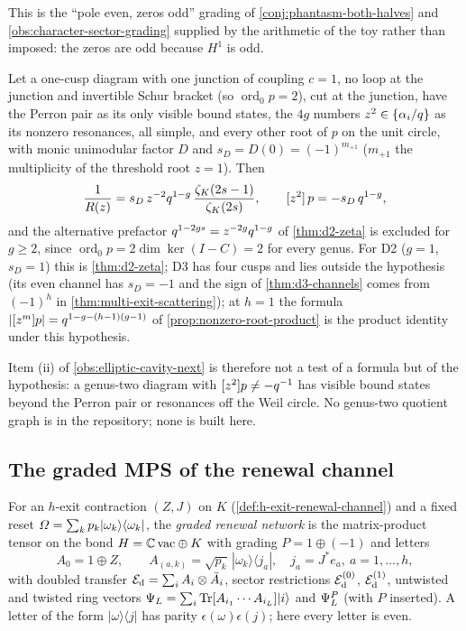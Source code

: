 This is the ``pole even, zeros odd'' grading of \cref{conj:phantasm-both-halves} and \cref{obs:character-sector-grading}
supplied by the arithmetic of the toy rather than imposed: the zeros are odd because $H^1$ is odd.

\begin{proposition}
\label{prop:genus-prefactor-forced}
Let a one-cusp diagram with one junction of coupling $c = 1$, no loop at the junction and invertible Schur
bracket (so $\operatorname{ord}_0p = 2$), cut at the junction, have the Perron pair as its only visible bound states,
the $4g$ numbers $z^2\in\{\alpha_{i}/q\}$ as its nonzero resonances, all simple, and every other root of $p$ on the
unit circle, with monic unimodular factor $D$ and $s_D = D(0) = (-1)^{m_{+1}}$
($m_{+1}$ the multiplicity of the threshold root $z = 1$). Then
\[
\frac1{R(z)} = s_D\,z^{-2}q^{1-g}\,\frac{\zeta_K(2s-1)}{\zeta_K(2s)},\qquad [z^2]\,p = -s_D\,q^{1-g},
\]
and the alternative prefactor $q^{1-2gs} = z^{-2g}q^{1-g}$ of \cref{thm:d2-zeta} is excluded for $g\ge2$, since
$\operatorname{ord}_0p = 2\dim\ker(I-C) = 2$ for every genus. For D2 ($g = 1$, $s_D = 1$) this is
\cref{thm:d2-zeta}; D3 has four cusps and lies outside the hypothesis (its even channel has $s_D = -1$ and the sign
of \cref{thm:d3-channels} comes from $(-1)^h$ in \cref{thm:multi-exit-scattering}); at $h = 1$ the formula $|[z^m]p| = q^{1-g-(h-1)(g-1)}$ of
\cref{prop:nonzero-root-product} is the product identity under this hypothesis.
\end{proposition}

Item (ii) of \cref{obs:elliptic-cavity-next} is therefore not a test of a formula but of the hypothesis: a
genus-two diagram with $[z^2]p\ne-q^{-1}$ has visible bound states beyond the Perron pair or resonances off
the Weil circle. No genus-two quotient graph is in the repository; none is built here.

\subsection{The graded MPS of the renewal channel}

\begin{definition}
\label{def:graded-renewal-network}
For an $h$-exit contraction $(Z,J)$ on $K$ (\cref{def:h-exit-renewal-channel}) and a fixed reset
$\varOmega = \sum_kp_k|\omega_k\rangle\langle\omega_k|$, the \emph{graded renewal network} is the matrix-product tensor
on the bond $H = \mathbb C\,\mathrm{vac}\oplus K$ with grading $P = 1\oplus(-1)$ and letters
\[
A_0 = 1\oplus Z,\qquad A_{(a,k)} = \sqrt{p_k}\,|\omega_k\rangle\langle j_a|,\quad j_a = J^{*}e_a,\ a = 1,\dots,h ,
\]
with doubled transfer $\mathcal E_{\mathrm d} = \sum_iA_i\otimes\bar A_i$, sector restrictions ${\mathcal E_{\mathrm d}^{(0)}}$, ${\mathcal E_{\mathrm d}^{(1)}}$, untwisted and
twisted ring vectors $\Psi_{L} = \sum_i\operatorname{Tr}[A_{i_1}\cdots A_{i_L}]|i\rangle$ and $\Psi_{L}^P$ (with $P$ inserted). A
letter of the form $|\omega\rangle\langle j|$ has parity $\epsilon(\omega)\epsilon(j)$; here every letter is even.
\end{definition}


